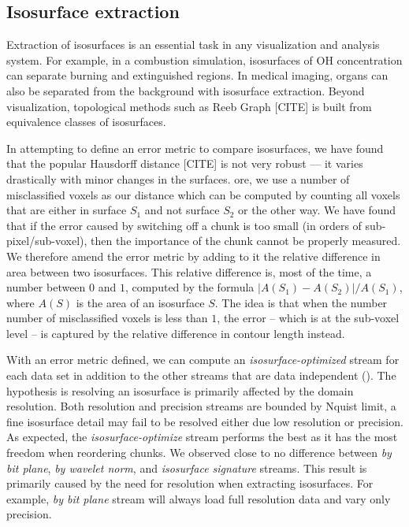 \subsection{Isosurface extraction}\label{sec:isocontour}
Extraction of isosurfaces is an essential task in any visualization and analysis system. For
example, in a combustion simulation, isosurfaces of OH concentration can separate burning and
extinguished regions. In medical imaging, organs can also be separated from the background with
isosurface extraction. Beyond visualization, topological methods such as Reeb Graph [CITE] is built
from equivalence classes of isosurfaces.

In attempting to define an error metric to compare isosurfaces, we have found that the popular
Hausdorff distance [CITE] is not very robust --- it varies drastically with minor changes in the
surfaces. ore, we use a number of misclassified voxels as our distance which can be computed by
counting all voxels that are either in surface $S_1$ and not surface $S_2$ or the other way.
We have found that if the error caused by switching off a
chunk is too small (in orders of sub-pixel/sub-voxel), then the importance of the chunk cannot be
properly measured. We therefore amend the error metric by adding to it the relative difference in
area between two isosurfaces. This relative difference is, most of the time, a number between $0$
and $1$, computed by the formula $|A(S_1)-A(S_2)|/A(S_1)$, where $A(S)$ is the area of an isosurface
$S$. The idea is that when the number number of misclassified voxels is less than $1$, the error --
which is at the sub-voxel level -- is captured by the relative difference in contour length instead.

With an error metric defined, we can compute an \emph{isosurface-optimized} stream for each data set
in addition to the other streams that are data independent (). The
hypothesis is resolving an isosurface is primarily affected by the domain resolution. Both
resolution and precision streams are bounded by Nquist limit, a fine isosurface detail may fail to
be resolved either due low resolution or precision. As expected, the {\em isosurface-optimize}
stream performs the best as it has the most freedom when reordering chunks. We observed close to no
difference between {\em by bit plane}, {\em by wavelet norm}, and {\em isosurface signature}
streams. This result is primarily caused by the need for resolution when extracting isosurfaces. For
example, {\em by bit plane} stream will always load full resolution data and vary only precision.

